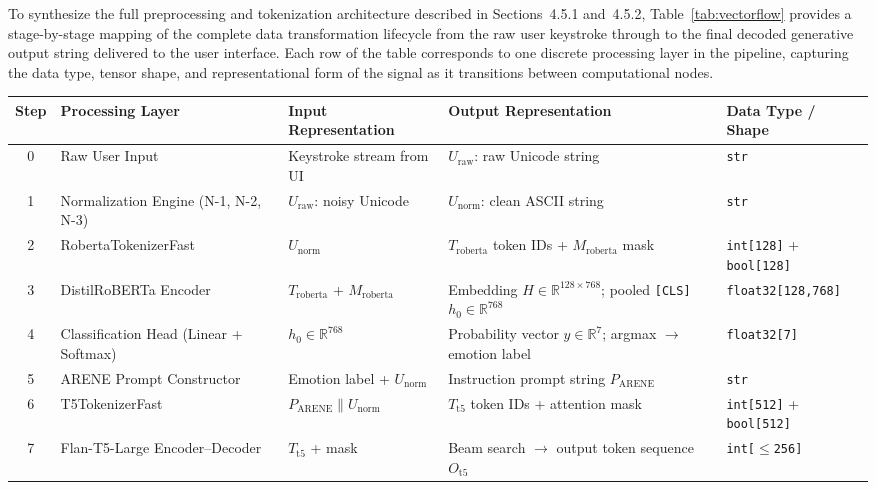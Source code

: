\documentclass[12pt,twoside]{article}
\begin{document}
To synthesize the full preprocessing and tokenization architecture described in Sections~4.5.1 and~4.5.2, Table~\ref{tab:vectorflow} provides a stage-by-stage mapping of the complete data transformation lifecycle from the raw user keystroke through to the final decoded generative output string delivered to the user interface. Each row of the table corresponds to one discrete processing layer in the pipeline, capturing the data type, tensor shape, and representational form of the signal as it transitions between computational nodes.

\begin{table}[htbp]
\centering
\Large
\renewcommand{\arraystretch}{2.4}
\setlength{\tabcolsep}{12pt}
\begin{adjustbox}{max width=\textwidth, max totalheight=0.82\textheight}
\begin{tabular}{|c|p{3.2cm}|p{4.5cm}|p{4.5cm}|p{3.5cm}|}
\hline
\rowcolor{gray!20}
\textbf{Step} & \textbf{Processing Layer} & \textbf{Input Representation} & \textbf{Output Representation} & \textbf{Data Type / Shape} \\
\hline
0 & Raw User Input & Keystroke stream from UI & $U_{\text{raw}}$: raw Unicode string & \texttt{str} \\
\hline
1 & Normalization Engine (N-1, N-2, N-3) & $U_{\text{raw}}$: noisy Unicode & $U_{\text{norm}}$: clean ASCII string & \texttt{str} \\
\hline
2 & RobertaTokenizerFast & $U_{\text{norm}}$ & $T_{\text{roberta}}$ token IDs + $M_{\text{roberta}}$ mask & \texttt{int[128]} + \texttt{bool[128]} \\
\hline
3 & DistilRoBERTa Encoder & $T_{\text{roberta}}$ + $M_{\text{roberta}}$ & Embedding $H \in \mathbb{R}^{128 \times 768}$; pooled \texttt{[CLS]} $h_0 \in \mathbb{R}^{768}$ & \texttt{float32[128,768]} \\
\hline
4 & Classification Head (Linear + Softmax) & $h_0 \in \mathbb{R}^{768}$ & Probability vector $\hat{y} \in \mathbb{R}^{7}$; argmax $\rightarrow$ emotion label & \texttt{float32[7]} \\
\hline
5 & ARENE Prompt Constructor & Emotion label + $U_{\text{norm}}$ & Instruction prompt string $P_{\text{ARENE}}$ & \texttt{str} \\
\hline
6 & T5TokenizerFast & $P_{\text{ARENE}} \| U_{\text{norm}}$ & $T_{\text{t5}}$ token IDs + attention mask & \texttt{int[512]} + \texttt{bool[512]} \\
\hline
7 & Flan-T5-Large Encoder--Decoder & $T_{\text{t5}}$ + mask & Beam search $\rightarrow$ output token sequence $O_{\text{t5}}$ & \texttt{int[$\leq$256]} \\

\end{tabular}
\end{adjustbox}
\end{table}
\end{document}
